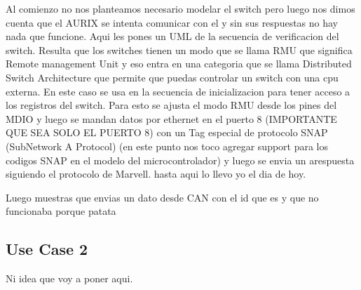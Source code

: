 Al comienzo no nos planteamos necesario modelar el switch pero luego nos dimos cuenta que el AURIX se intenta comunicar con el y sin sus respuestas no hay nada que funcione. Aqui les pones un UML de la secuencia de verificacion del switch. Resulta que los switches tienen un modo que se llama RMU que significa Remote management Unit y eso entra en una categoria que se llama Distributed Switch Architecture que permite que puedas controlar un switch con una cpu externa. En este caso se usa en la secuencia de inicializacion para tener acceso a los registros del switch. Para esto se ajusta el modo RMU desde los pines del MDIO y luego se mandan datos por ethernet en el puerto 8 (IMPORTANTE QUE SEA SOLO EL PUERTO 8) con un Tag especial de protocolo SNAP (SubNetwork A Protocol) (en este punto nos toco agregar support para los codigos SNAP en el modelo del microcontrolador) y luego se envia un arespuesta siguiendo el protocolo de Marvell. hasta aqui lo llevo yo el dia de hoy.

Luego muestras que envias un dato desde CAN con el id que es y que no funcionaba porque patata

\subsection{Use Case 2}

Ni idea que voy a poner aqui.
